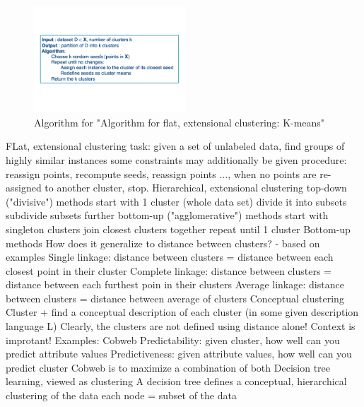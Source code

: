 \begin{figure}[htbp]
    \centering
    \includegraphics[height=4cm]{../figs/kmean_algorithm.pdf}
    \caption{Algorithm for "Algorithm for flat, extensional clustering: K-means"}
    \label{fig:kmeans_algorithm}
\end{figure}

\begin{outline}
    \1 FLat, extensional clustering
        \2 task: given a set of unlabeled data, find groups of highly similar instances
        \2 some constraints may additionally be given
        \2 procedure: reassign points, recompute seeds, reassign points ..., when no points are re-assigned to another cluster, stop.
    \1 Hierarchical, extensional clustering
        \2 top-down ("divisive") methods
            \3 start with 1 cluster (whole data set)
            \3 divide it into subsets
            \3 subdivide subsets further
        \2 bottom-up ("agglomerative") methods
            \3 start with singleton clusters
            \3 join closest clusters together
            \3 repeat until 1 cluster
    \1 Bottom-up methods
        \2 How does it generalize to distance between clusters? - based on examples
            \3 Single linkage: distance between clusters = distance between each closest point in their cluster
            \3 Complete linkage: distance between clusters = distance between each furthest poin in their clusters
            \3 Average linkage: distance between clusters = distance between average of clusters 
    \1 Conceptual clustering
        \2 Cluster + find a conceptual description of each cluster (in some given description language L)
        \2 Clearly, the clusters are not defined using distance alone! Context is improtant!
    \1 Examples: Cobweb
        \2 Predictability: given cluster, how well can you predict attribute values
        \2 Predictiveness: given attribute values, how well can you predict cluster
        \2 Cobweb is to maximize a combination of both
    \1 Decision tree learning, viewed as clustering
        \2 A decision tree defines a conceptual, hierarchical clustering of the data
            \3 each node = subset of the data

\end{outline}
